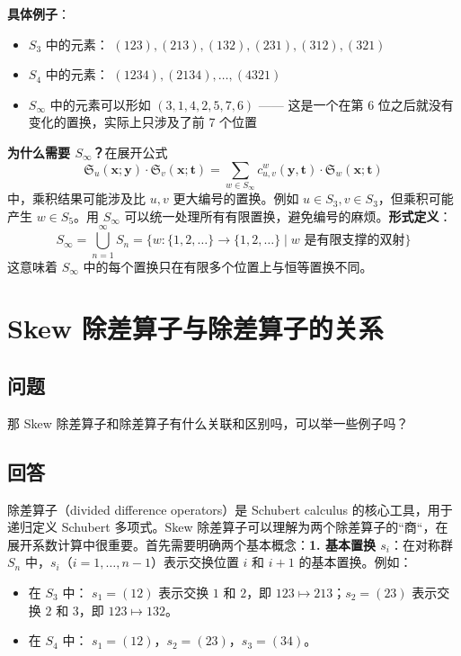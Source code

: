 \textbf{具体例子}：
\begin{itemize}
\item $S_3$ 中的元素：
$(123), (213), (132), (231), (312), (321)$\item $S_4$ 中的元素：
$(1234), (2134), \ldots, (4321)$\item $S_\infty$ 中的元素可以形如
 $(3,1,4,2,5,7,6)$ —— 这是一个在第 6 位之后就没有变化的置换，实际上只涉及了前 7 个位置
\end{itemize}

\textbf{为什么需要 $S_\infty$？}在展开公式$$\mathfrak{S}_u(\mathbf{x}; \mathbf{y}) \cdot \mathfrak{S}_v(\mathbf{x}; \mathbf{t}) = \sum_{w \in S_\infty} c^w_{u,v}(\mathbf{y}, \mathbf{t}) \cdot \mathfrak{S}_w(\mathbf{x}; \mathbf{t})$$中，乘积结果可能涉及比 $u, v$ 更大编号的置换。例如 $u \in S_3, v \in S_3$，但乘积可能产生 $w \in S_5$。用 $S_\infty$ 可以统一处理所有有限置换，避免编号的麻烦。\textbf{形式定义}：$$S_\infty = \bigcup_{n=1}^\infty S_n = \{w : \{1, 2, \ldots\} \to \{1, 2, \ldots\} \mid w \text{ 是有限支撑的双射}\}$$这意味着 $S_\infty$ 中的每个置换只在有限多个位置上与恒等置换不同。
\section{Skew 除差算子与除差算子的关系}\label{sec:SkewVsDivided}
\subsection{问题}
那 Skew 除差算子和除差算子有什么关联和区别吗，可以举一些例子吗？
\subsection{回答}
除差算子（divided difference operators）是 Schubert calculus 的核心工具，用于递归定义 Schubert 多项式。Skew 除差算子可以理解为两个除差算子的``商``，在展开系数计算中很重要。首先需要明确两个基本概念：\textbf{1. 基本置换 $s_i$}：在对称群 $S_n$ 中，$s_i$（$i = 1, \ldots, n-1$）表示交换位置 $i$ 和 $i+1$ 的基本置换。例如：
\begin{itemize}
\item 在 $S_3$ 中：
$s_1 = (12)$ 表示交换 $1$ 和 $2$，即 $123 \mapsto 213$；$s_2 = (23)$ 表示交换 $2$ 和 $3$，即 $123 \mapsto 132$。\item 在 $S_4$ 中：
$s_1 = (12)$，$s_2 = (23)$，$s_3 = (34)$。

\end{itemize}


